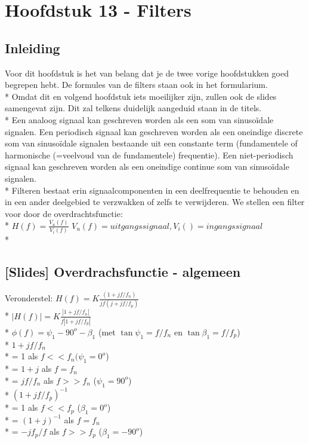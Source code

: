 \documentclass[10pt]{article}
\begin{document}
\section{Hoofdstuk 13 - Filters}
\subsection{Inleiding}
Voor dit hoofdstuk is het van belang dat je de twee vorige hoofdstukken goed begrepen hebt. De formules van de filters staan ook in het formularium.\\*
Omdat dit en volgend hoofdstuk iets moeilijker zijn, zullen ook de slides samengevat zijn. Dit zal telkens duidelijk aangeduid staan in de titels.\\*
Een analoog signaal kan geschreven worden als een som van sinuso\"idale signalen. Een periodisch signaal kan geschreven worden als een oneindige discrete som van sinuso\"idale signalen bestaande uit een constante term (fundamentele of harmonische (=veelvoud van de fundamentele) frequentie). Een niet-periodisch signaal kan geschreven worden als een oneindige continue som van sinuso\"idale signalen.\\*
Filteren bestaat erin signaalcomponenten in een deelfrequentie te behouden en in een ander deelgebied te verzwakken of zelfs te verwijderen. We stellen een filter voor door de overdrachtsfunctie:\\*
$H(f) = \frac{V_u(f)}{V_i{(f)}}$ {\scriptsize $V_u(f) = uitgangssignaal, V_i() = ingangssignaal$}\\*
\subsection{[Slides] Overdrachsfunctie - algemeen}
Veronderstel: $H(f) = K\frac{(1+jf/f_n)}{jf(j+jf/f_p)}$\\*
$|H(f)| = K\frac{|1+jf/f_n|}{f|1+jf/f_p|}$\\*
$\phi(f) = \psi_1-90^o-\beta_1$ {\scriptsize (met $\tan{\psi_1} = f/f_n$} en $\tan{\beta_1} = f/f_p$)\\*
$1+jf/f_n$\\*
= 1 als $f<<f_n (\psi_1 = 0^o$)\\*
= $1+j$ als $f=f_n$\\*
= $jf/f_n$ als $f>>f_n$ ($\psi_1=90^o$)\\*
$(1+jf/f_p)^{-1}$\\*
= 1 als $f<<f_p$ ($\beta_1 = 0^o$)\\*
= $(1+j)^{-1}$ als $f=f_n$\\*
= $-jf_p/f$ als $f>>f_p$ ($\beta_1=-90^o$)
\end{document}

